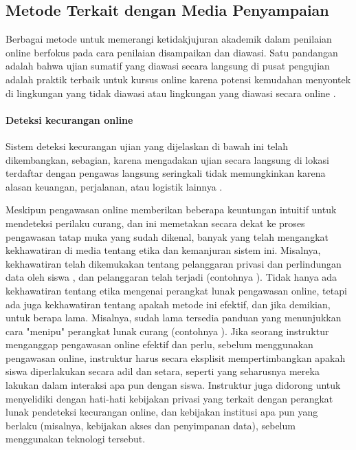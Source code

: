 \subsection{Metode Terkait dengan Media Penyampaian}
\label{subsec:metodemediapenyampaian}

Berbagai metode untuk memerangi ketidakjujuran akademik dalam penilaian online berfokus pada cara penilaian disampaikan dan diawasi. Satu pandangan adalah bahwa ujian sumatif yang diawasi secara langsung di pusat pengujian adalah praktik terbaik untuk kursus online karena potensi kemudahan menyontek di lingkungan yang tidak diawasi atau lingkungan yang diawasi secara online \citep{edling2000information} \citep{rovai2000online} \citep{deal2002distance}.

\paragraph{Deteksi kecurangan online}
\label{par:deteksikecuranganonline}

Sistem deteksi kecurangan ujian yang dijelaskan di bawah ini telah dikembangkan, sebagian, karena mengadakan ujian secara langsung di lokasi terdaftar dengan pengawas langsung seringkali tidak memungkinkan karena alasan keuangan, perjalanan, atau logistik lainnya \citep{cluskey2011thwarting}. 

Meskipun pengawasan online memberikan beberapa keuntungan intuitif untuk mendeteksi perilaku curang, dan ini memetakan secara dekat ke proses pengawasan tatap muka yang sudah dikenal, banyak yang telah mengangkat kekhawatiran di media tentang etika dan kemanjuran sistem ini. Misalnya, kekhawatiran telah dikemukakan tentang pelanggaran privasi dan perlindungan data oleh siswa \citep{lawson2020schools}, dan pelanggaran telah terjadi (contohnya \citet{holden2021academic}). Tidak hanya ada kekhawatiran tentang etika mengenai perangkat lunak pengawasan online, tetapi ada juga kekhawatiran tentang apakah metode ini efektif, dan jika demikian, untuk berapa lama. Misalnya, sudah lama tersedia panduan yang menunjukkan cara "menipu" perangkat lunak curang (contohnya \citet{binstein2015knuckle}). Jika seorang instruktur menganggap pengawasan online efektif dan perlu, sebelum menggunakan pengawasan online, instruktur harus secara eksplisit mempertimbangkan apakah siswa diperlakukan secara adil dan setara, seperti yang seharusnya mereka lakukan dalam interaksi apa pun dengan siswa. Instruktur juga didorong untuk menyelidiki dengan hati-hati kebijakan privasi yang terkait dengan perangkat lunak pendeteksi kecurangan online, dan kebijakan institusi apa pun yang berlaku (misalnya, kebijakan akses dan penyimpanan data), sebelum menggunakan teknologi tersebut. 


